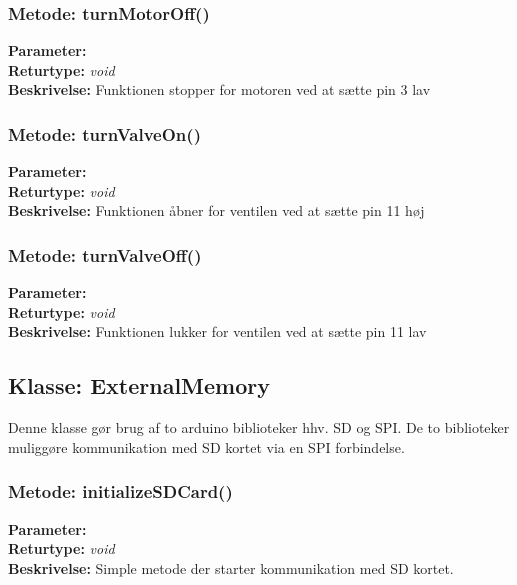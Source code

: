 \subsubsection{Metode: turnMotorOff()}
\textbf{Parameter: } 
\\ \textbf{Returtype: } \textit{void}
\\ \textbf{Beskrivelse: }   Funktionen stopper for motoren ved at sætte pin 3 lav

\subsubsection{Metode: turnValveOn()}
\textbf{Parameter: } 
\\ \textbf{Returtype: } \textit{void}
\\ \textbf{Beskrivelse: }  Funktionen åbner for ventilen ved at sætte pin 11 høj

\subsubsection{Metode: turnValveOff()}
\textbf{Parameter: } 
\\ \textbf{Returtype: } \textit{void}
\\ \textbf{Beskrivelse: }  Funktionen lukker for ventilen ved at sætte pin 11 lav

\subsection{Klasse: ExternalMemory}
Denne klasse gør brug af to arduino biblioteker hhv. SD og SPI.  De to biblioteker muliggøre kommunikation med SD kortet via en SPI forbindelse. 

\subsubsection{Metode: initializeSDCard()}
\textbf{Parameter: } 
\\ \textbf{Returtype: } \textit{void}
\\ \textbf{Beskrivelse: }  Simple metode der starter kommunikation med SD kortet.

